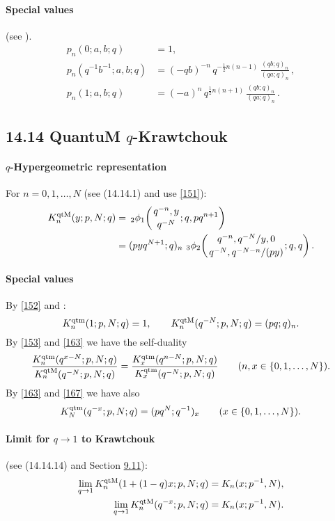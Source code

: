 \documentclass[twoside,11pt]{article}
\newcommand\half{\frac12}
\newcommand{\qhyp}[5]{\,\mbox{}_{#1}\phi_{#2}\!\left( 
  \genfrac{}{}{0pt}{}{#3}{#4};#5\right)}
\begin{document}
\paragraph{Special values} 
(see \cite[\S2.4]{K17}). 
\begin{align} 
p_n(0;a,b;q)&=1,\label{127}\\ 
p_n(q^{-1}b^{-1};a,b;q)&=(-qb)^{-n}\,q^{-\half n(n-1)}\,\frac{(qb;q)_n}{(qa;q)_n}\,,\label{128}\\ 
p_n(1;a,b;q)&=(-a)^n\,q^{\half n(n+1)}\,\frac{(qb;q)_n}{(qa;q)_n}\,.\label{129} 
\end{align} 
% 
\subsection*{14.14 QuantuM $q$-Krawtchouk} 
\label{sec14.14} 
% 
\paragraph{$q$-Hypergeometric representation} 
For $n=0,1,\ldots,N$ 
(see (14.14.1) and use \eqref{151}): 
\begin{align} 
K_n^{\rm qtM}(y;p,N;q) 
&=\qhyp21{q^{-n},y}{q^{-N}}{q,pq^{n+1}} 
\label{152}\\ 
&=(pyq^{N+1};q)_n\, 
\qhyp32{q^{-n},q^{-N}/y,0}{q^{-N},q^{-N-n}/(py)}{q,q}. 
\label{153} 
\end{align} 
% 
\paragraph{Special values} 
By \eqref{152} and : 
\begin{equation} 
K_n^{\rm qtm}(1;p,N;q)=1,\qquad 
K_n^{\rm qtM}(q^{-N};p,N;q)=(pq;q)_n. 
\label{163} 
\end{equation} 
By \eqref{153} and \eqref{163} we have the self-duality 
\begin{equation} 
\frac{K_n^{\rm qtm}(q^{x-N};p,N;q)}{K_n^{\rm qtM}(q^{-N};p,N;q)} 
=\frac{K_x^{\rm qtm}(q^{n-N};p,N;q)}{K_x^{\rm qtm}(q^{-N};p,N;q)}\qquad 
(n,x\in\{0,1,\ldots,N\}). 
\label{167} 
\end{equation} 
By \eqref{163} and \eqref{167} we have also 
\begin{equation} 
K_N^{\rm qtm}(q^{-x};p,N;q)=(pq^N;q^{-1})_x\qquad(x\in\{0,1,\ldots,N\}). 
\label{169} 
\end{equation} 
% 
\paragraph{Limit for $q\to1$ to Krawtchouk} (see (14.14.14) and Section \hyperref[sec9.11]{9.11}): 
\begin{align} 
\lim_{q\to1} K_n^{\rm qtM}(1+(1-q)x;p,N;q)&=K_n(x;p^{-1},N), 
\label{161}\\ 
\lim_{q\to1} K_n^{\rm qtM}(q^{-x};p,N;q)&=K_n(x;p^{-1},N). 
\label{164} 
\end{align} 
% 
\end{document}
